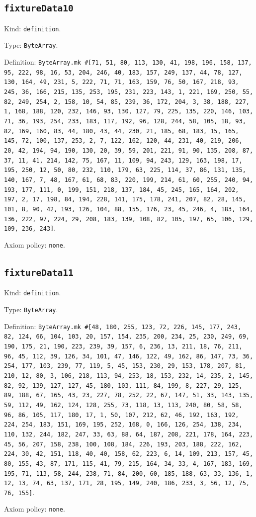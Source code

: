 \documentclass[11pt]{article}
\begin{document}
\subsection*{\texttt{fixtureData10}}
\noindent Kind: \texttt{definition}.\par
\noindent Type: \texttt{ByteArray}.\par
\noindent Definition: \texttt{ByteArray.mk \#[71, 51, 80, 113, 130, 41, 198, 196, 158, 137, 95, 222, 98, 16, 53, 204, 246, 40, 183, 157, 249, 137, 44, 78, 127, 130, 164, 49, 231, 5, 222, 71, 71, 163, 159, 76, 50, 167, 218, 93, 245, 36, 166, 215, 135, 253, 195, 231, 223, 143, 1, 221, 169, 250, 55, 82, 249, 254, 2, 158, 10, 54, 85, 239, 36, 172, 204, 3, 38, 188, 227, 1, 168, 188, 120, 232, 146, 93, 130, 127, 79, 225, 135, 220, 146, 103, 71, 36, 193, 254, 233, 183, 117, 192, 96, 128, 244, 58, 105, 18, 93, 82, 169, 160, 83, 44, 180, 43, 44, 230, 21, 185, 68, 183, 15, 165, 145, 72, 100, 137, 253, 2, 7, 122, 162, 120, 44, 231, 40, 219, 206, 20, 42, 194, 94, 190, 130, 20, 39, 59, 201, 221, 91, 90, 135, 208, 87, 37, 11, 41, 214, 142, 75, 167, 11, 109, 94, 243, 129, 163, 198, 17, 195, 250, 12, 50, 80, 232, 110, 179, 63, 225, 114, 37, 86, 131, 135, 140, 167, 7, 48, 167, 61, 68, 83, 220, 199, 214, 61, 60, 255, 240, 94, 193, 177, 111, 0, 199, 151, 218, 137, 184, 45, 245, 165, 164, 202, 197, 2, 17, 198, 84, 194, 228, 141, 175, 178, 241, 207, 82, 28, 145, 101, 8, 90, 42, 193, 126, 104, 88, 155, 176, 23, 45, 246, 4, 183, 164, 136, 222, 97, 224, 29, 208, 183, 139, 108, 82, 105, 197, 65, 106, 129, 109, 236, 243]}.\par
\noindent Axiom policy: \texttt{none}.\par
\subsection*{\texttt{fixtureData11}}
\noindent Kind: \texttt{definition}.\par
\noindent Type: \texttt{ByteArray}.\par
\noindent Definition: \texttt{ByteArray.mk \#[48, 180, 255, 123, 72, 226, 145, 177, 243, 82, 124, 66, 104, 103, 20, 157, 154, 235, 200, 234, 25, 230, 249, 69, 190, 175, 21, 190, 223, 239, 39, 157, 6, 236, 13, 211, 18, 76, 211, 96, 45, 112, 39, 126, 34, 101, 47, 146, 122, 49, 162, 86, 147, 73, 36, 254, 177, 103, 239, 77, 119, 5, 45, 153, 230, 29, 153, 178, 207, 81, 210, 12, 80, 3, 106, 218, 113, 94, 253, 18, 153, 232, 14, 235, 2, 145, 82, 92, 139, 127, 127, 45, 180, 103, 111, 84, 199, 8, 227, 29, 125, 89, 188, 67, 165, 43, 23, 227, 78, 252, 22, 67, 147, 51, 33, 143, 135, 59, 112, 49, 162, 124, 128, 255, 73, 118, 13, 113, 240, 80, 58, 58, 96, 86, 105, 117, 180, 17, 1, 50, 107, 212, 62, 46, 192, 163, 192, 224, 254, 183, 151, 169, 195, 252, 168, 0, 166, 126, 254, 138, 234, 110, 132, 244, 182, 247, 33, 63, 88, 64, 187, 208, 221, 178, 164, 223, 45, 56, 207, 158, 238, 100, 108, 184, 226, 193, 203, 188, 222, 162, 224, 30, 42, 151, 118, 40, 40, 158, 62, 223, 6, 14, 109, 213, 157, 45, 80, 155, 43, 87, 171, 115, 41, 79, 215, 164, 34, 33, 4, 167, 183, 169, 195, 71, 113, 58, 244, 238, 71, 84, 200, 60, 185, 188, 63, 33, 136, 1, 12, 13, 74, 63, 137, 171, 28, 195, 149, 240, 186, 233, 3, 56, 12, 75, 76, 155]}.\par
\noindent Axiom policy: \texttt{none}.\par
\end{document}
